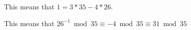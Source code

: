 \documentclass[11pt]{article}
\newif\ifsolutions
\begin{document}
\begin{enumerate}
This means that $1 = 3*35 -4*26$.

This means that $26^{-1} \bmod{35} \equiv -4 \bmod{35} \equiv 31 \bmod{35}$


\fi
%
%
%
%






   
 \end{enumerate}
\end{document}

